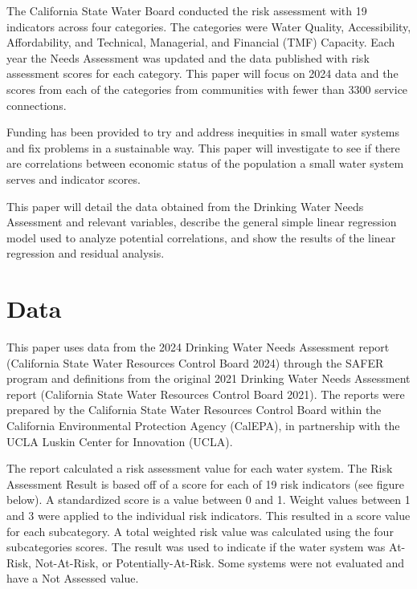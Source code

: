 \documentclass[
  letterpaper,
  DIV=11,
  numbers=noendperiod]{scrartcl}
\begin{document}
The California State Water Board conducted the risk assessment with 19
indicators across four categories. The categories were Water Quality,
Accessibility, Affordability, and Technical, Managerial, and Financial
(TMF) Capacity. Each year the Needs Assessment was updated and the data
published with risk assessment scores for each category. This paper will
focus on 2024 data and the scores from each of the categories from
communities with fewer than 3300 service connections.

Funding has been provided to try and address inequities in small water
systems and fix problems in a sustainable way. This paper will
investigate to see if there are correlations between economic status of
the population a small water system serves and indicator scores.

This paper will detail the data obtained from the Drinking Water Needs
Assessment and relevant variables, describe the general simple linear
regression model used to analyze potential correlations, and show the
results of the linear regression and residual analysis.

\section{Data}\label{sec-data}

This paper uses data from the 2024 Drinking Water Needs Assessment
report (California State Water Resources Control Board 2024) through the
SAFER program and definitions from the original 2021 Drinking Water
Needs Assessment report (California State Water Resources Control Board
2021). The reports were prepared by the California State Water Resources
Control Board within the California Environmental Protection Agency
(CalEPA), in partnership with the UCLA Luskin Center for Innovation
(UCLA).

The report calculated a risk assessment value for each water system. The
Risk Assessment Result is based off of a score for each of 19 risk
indicators (see figure below). A standardized score is a value between 0
and 1. Weight values between 1 and 3 were applied to the individual risk
indicators. This resulted in a score value for each subcategory. A total
weighted risk value was calculated using the four subcategories scores.
The result was used to indicate if the water system was At-Risk,
Not-At-Risk, or Potentially-At-Risk. Some systems were not evaluated and
have a Not Assessed value.
\end{document}
